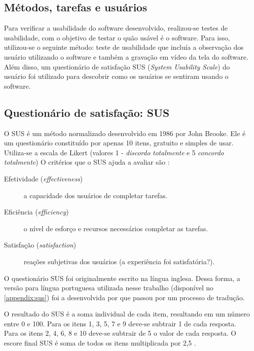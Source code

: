 \subsection{Métodos, tarefas e usuários}

Para verificar a usabilidade do software desenvolvido, realizou-se testes de usabilidade, com o
objetivo de testar o quão usável é o software. Para isso, utilizou-se o seguinte método: teste de usabilidade
que incluía a observação dos usuário utilizando o software e também a gravação em vídeo da tela do
software. Além disso, um questionário de satisfação SUS (\textit{System Usability Scale}) do usuário foi utilizado para descobrir como
os usuários se sentiram usando o software.

\subsection{Questionário de satisfação: SUS}\label{sub:sus}

O SUS é um método normalizado desenvolvido em 1986 por John Brooke.
Ele é um questionário constituído por apenas 10 itens, gratuito e simples de usar.
Utiliza-se a escala de Likert (valores 1 - \textit{discordo totalmente} e 5 \textit{concordo totalmente})
O critérios que o SUS ajuda a avaliar são \cite{brooke1996sus}:

\begin{description}
  \item[Efetividade (\textit{effectiveness})] a capacidade dos usuários de completar tarefas.
  \item[Eficiência (\textit{efficiency})] o nível de esforço e recursos necessários completar as tarefas.
  \item[Satisfação (\textit{satisfaction})] reações subjetivas dos usuários (a experiência foi satisfatória?).
\end{description}

O questionário SUS foi originalmente escrito na língua inglesa. Dessa forma, a versão para língua portuguesa
utilizada nesse trabalho (disponível no \autoref{appendix:sus}) foi a desenvolvida por  que passou por um processo
de tradução.

O resultado do SUS é a soma individual de cada item, resultando em um número entre 0 e 100.
Para os itens 1, 3, 5, 7 e 9 deve-se subtrair 1 de cada resposta. Para os itens 2, 4, 6, 8 e 10 deve-se
subtrair de 5 o valor de cada resposta. O escore final SUS é soma de todos os itens multiplicada por 2,5 \cite{brooke1996sus}.

